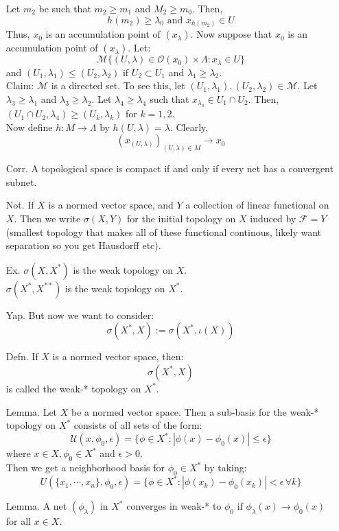 \documentclass[12pt]{article}
\begin{document}
\begin{itemize}
    Let $m_2$ be such that $m_2 \geq m_1$ and $M_2 \geq m_0$. Then,
    \[ h(m_2) \geq \lambda_0 \text{ and } x_{h(m_2)} \in U\]
    Thus, $x_0$ is an accumulation point of $(x_\lambda)$. \bbni
    Now suppose that $x_0$ is an accumulation point of $(x_\lambda)$. Let: 
    \[ \mathcal M \{(U, \lambda) \in \mathcal{O}(x_0) \times \Lambda : x_\lambda \in U\}\]
    and $(U_1, \lambda_1) \leq (U_2, \lambda_2)$ if $U_2 \subset U_1$ and $\lambda_1 \geq \lambda_2$. \\
    Claim: $\mathcal{M}$ is a directed set. To see this, let $(U_1, \lambda_1), (U_2, \lambda_2) \in \mathcal{M}$. Let $\lambda_3 \geq \lambda_1$ and $\lambda_3 \geq \lambda_2$. Let $\lambda_4 \geq \lambda_4$ such that $x_{\lambda_4} \in U_1 \cap U_2$. Then, $(U_1 \cap U_2, \lambda_4) \geq (U_k, \lambda_k)$ for $k = 1, 2$. \\
    Now define $h: M \to \Lambda$ by $h(U, \lambda) = \lambda$. Clearly, 
    \[ (x_{(U, \lambda)})_{(U, \lambda)\in M} \to x_0\]
    \item[Corr.] A topological space is compact if and only if every net has a convergent subnet. 
    \item[Not.] If $X$ is a normed vector space, and $Y$ a collection of linear functional on $X$. Then we write $\sigma(X, Y)$ for the initial topology on $X$ induced by $\mathcal{F} = Y$ (smallest topology that makes all of these functional continous, likely want separation so you get Hausdorff etc). 
    \item[Ex.] $\sigma(X, X^*)$ is the weak topology on $X$. \\
    $\sigma(X^*, X^{**})$ is the weak topology on $X^*$.
    \item[Yap.] But now we want to consider: 
    \[ \sigma(X^*, X) := \sigma(X^*, \iota(X))\]
    \item[Defn.] If $X$ is a normed vector space, then: 
    \[ \sigma(X^*, X)\]
    is called the weak-* topology on $X^*$.
    \item[Lemma.] Let $X$ be a normed vector space. Then a sub-basis for the weak-* topology on $X^*$ consists of all sets of the form:
    \[  \mathcal{U}(x, \phi_0, \epsilon) = \{\phi \in X^* : |\phi(x)-\phi_0(x)| \leq \epsilon \}\]
    where $x \in X, \phi_0 \in X^*$ and $\epsilon > 0$. \\
    Then we get a neighborhood basis for $\phi_0 \in X^*$ by taking: 
    \[ U(\{x_1, \cdots, x_n\}, \phi_0, \epsilon) = \{ \phi \in X^* : |\phi(x_k)-\phi_0(x_k)| < \epsilon \, \forall k\} \]
    \item[Lemma.] A net $(\phi_\lambda)$ in $X^*$ converges in weak-* to $\phi_0$ if $\phi_\lambda(x) \to \phi_0(x)$ for all $x \in X$.

\end{itemize}
\end{document}
